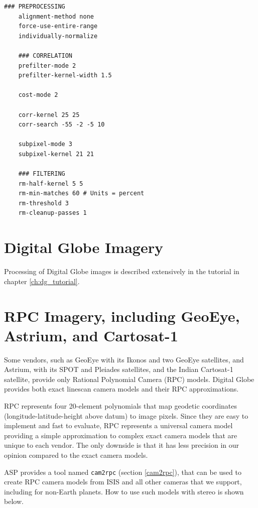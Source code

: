 \begin{center}\begin{minipage}{5.5in}
\begin{Verbatim}[frame=single,fontsize=\small,label=stereo.default for Cassini ISS]
    ### PREPROCESSING
    alignment-method none
    force-use-entire-range
    individually-normalize

    ### CORRELATION
    prefilter-mode 2
    prefilter-kernel-width 1.5

    cost-mode 2

    corr-kernel 25 25
    corr-search -55 -2 -5 10

    subpixel-mode 3
    subpixel-kernel 21 21

    ### FILTERING
    rm-half-kernel 5 5
    rm-min-matches 60 # Units = percent
    rm-threshold 3
    rm-cleanup-passes 1

\end{Verbatim}
\end{minipage}\end{center}

\section{Digital Globe Imagery}
\label{digital_globe_data}

Processing of Digital Globe images is described extensively in the
tutorial in chapter \ref{ch:dg_tutorial}.

\section{RPC Imagery, including GeoEye, Astrium, and Cartosat-1}
\label{rpc}

Some vendors, such as GeoEye with its Ikonos and two GeoEye satellites,
and Astrium, with its SPOT and Pleiades satellites, and the Indian Cartosat-1 
satellite, provide only
Rational Polynomial Camera (RPC) models. Digital Globe provides both
exact linescan camera models and their RPC approximations.

RPC represents four 20-element polynomials that map geodetic coordinates
(longitude-latitude-height above datum)
to image pixels. Since they are easy to implement and fast to
evaluate, RPC represents a universal camera model providing a simple
approximation to complex exact camera models that are unique to each
vendor. The only downside is that it has less precision in our
opinion compared to the exact camera models.

ASP provides a tool named \texttt{cam2rpc} (section \ref{cam2rpc}), that can be
used to create RPC camera models from ISIS and all other cameras
that we support, including for non-Earth planets. How to use
such models with stereo is shown below.   

